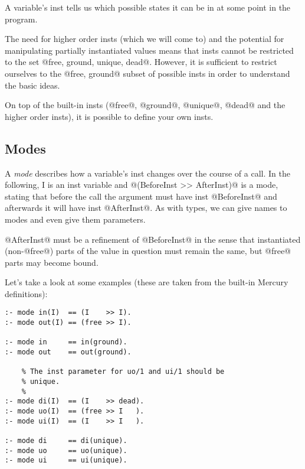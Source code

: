 A variable's inst tells us which possible states it can be
in at some point in the program.

The need for higher order insts (which we will come to)
and the potential for manipulating partially instantiated
values means that insts cannot be restricted to the set
@{free, ground, unique, dead}@.  However, it is sufficient
to restrict ourselves to the @{free, ground}@ subset of
possible insts in order to understand the basic ideas.


On top of the built-in insts (@free@, @ground@, @unique@, @dead@
and the higher order insts), it is possible to define your
own insts.  

\subsection{Modes}

A \emph{mode} describes how a variable's inst changes over the
course of a call.  In the following, I is an inst
variable and @(BeforeInst >> AfterInst)@ is a mode, stating
that before the call the argument must have inst
@BeforeInst@ and afterwards it will have inst @AfterInst@.  As
with types, we can give names to modes and even give them
parameters.

@AfterInst@ must be a refinement of @BeforeInst@ in the sense
that instantiated (\ie non-@free@) parts of the value in
question must remain the same, but @free@ parts may become
bound.  

Let's take a look at some examples (these are taken from
the built-in Mercury definitions):
\begin{verbatim}
:- mode in(I)  == (I    >> I).
:- mode out(I) == (free >> I).

:- mode in     == in(ground).
:- mode out    == out(ground).

    % The inst parameter for uo/1 and ui/1 should be
    % unique.
    %
:- mode di(I)  == (I    >> dead).
:- mode uo(I)  == (free >> I   ).
:- mode ui(I)  == (I    >> I   ).

:- mode di     == di(unique).
:- mode uo     == uo(unique).
:- mode ui     == ui(unique).
\end{verbatim}

